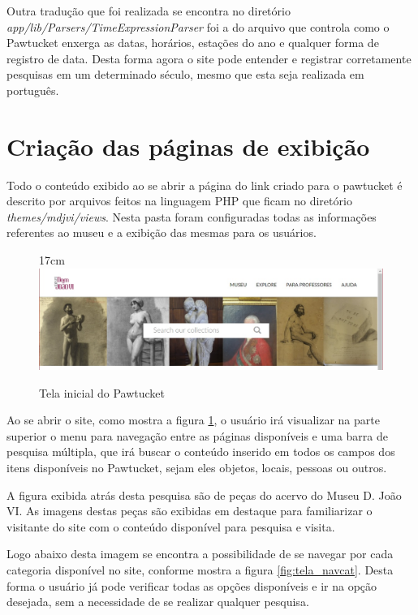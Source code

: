 \documentclass[a4paper,12pt,oneside,onecolumn,final,fleqn]{repUERJ}
\begin{document}
Outra tradução que foi realizada se encontra no diretório \textit{app/lib/Parsers/TimeExpressionParser} foi a do arquivo que controla como o Pawtucket enxerga as datas, horários, estações do ano e qualquer forma de registro de data. Desta forma agora o site pode entender e registrar corretamente pesquisas em um determinado século, mesmo que esta seja realizada em português.

\section{Criação das páginas de exibição}

Todo o conteúdo exibido ao se abrir a página do link criado para o pawtucket é descrito por arquivos feitos na linguagem PHP que ficam no diretório \textit{themes/mdjvi/views}. Nesta pasta foram configuradas todas as informações referentes ao museu e a exibição das mesmas para os usuários.

\begin{figure}[!ht]{17cm}
	\includegraphics[width=15cm, center]{figuras/pawtucket_telainicial.jpg}
	\caption{Tela inicial do Pawtucket} \label{fig:tela_inic}
\end{figure}

Ao se abrir o site, como mostra a figura \ref{fig:tela_inic}, o usuário irá visualizar na parte superior o menu para navegação entre as páginas disponíveis e uma barra de pesquisa múltipla, que irá buscar o conteúdo inserido em todos os campos dos itens disponíveis no Pawtucket, sejam eles objetos, locais, pessoas ou outros.

A figura exibida atrás desta pesquisa são de peças do acervo do Museu D. João VI. As imagens destas peças são exibidas em destaque para familiarizar o visitante do site com o conteúdo disponível para pesquisa e visita.

Logo abaixo desta imagem se encontra a possibilidade de se navegar por cada categoria disponível no site, conforme mostra a figura \ref{fig:tela_navcat}. Desta forma o usuário já pode verificar todas as opções disponíveis e ir na opção desejada, sem a necessidade de se realizar qualquer pesquisa.
\end{document}
